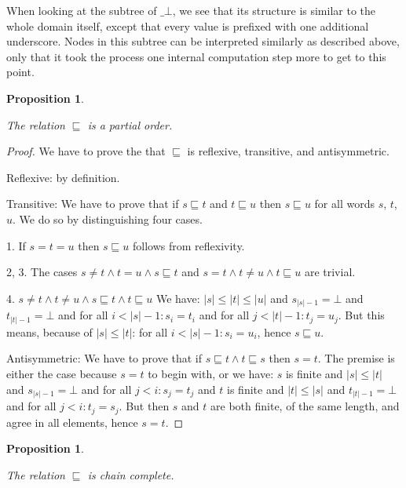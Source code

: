 \documentclass[a4paper]{article}
\newtheorem{thmPONuFisPartialOrder}[defNuF]{Proposition}
\newtheorem{thmPONuFisChainComplete}[defNuF]{Proposition}
\begin{document}
When looking at the subtree of $\_\bot$, we see that its structure is similar
to the whole domain itself, except that every value is prefixed with one additional
underscore.  Nodes in this subtree can be interpreted similarly as described
above, only that it took the process one internal computation step more to
get to this point.

\begin{thmPONuFisPartialOrder}
\label{thmPONuFisPartialOrder}

The relation $\sqsubseteq$ is a partial order.

\end{thmPONuFisPartialOrder}


\begin{proof}

We have to prove the that $\sqsubseteq$ is reflexive, transitive, and
antisymmetric.

Reflexive: by definition.

Transitive: We have to prove that if $s \sqsubseteq t$ and $t \sqsubseteq u$
then $s \sqsubseteq u$ for all words $s$, $t$, $u$. We do so by distinguishing
four cases.

1. If $s = t = u$ then $s \sqsubseteq u$ follows from reflexivity.

2, 3. The cases $s \neq t \wedge t = u \wedge s \sqsubseteq t$ and $s = t
\wedge t \neq u \wedge t \sqsubseteq u$ are trivial.

4. $s \neq t \wedge t \neq u \wedge s \sqsubseteq t \wedge t \sqsubseteq u$ We
have: $|s| \leq |t| \leq |u|$ and $s_{|s|-1} = \bot$ and $t_{|t|-1} = \bot$ and
for all $i < |s|-1: s_i = t_i$ and for all $j < |t|-1: t_j = u_j$.  But this
means, because of $|s| \leq |t|$: for all $i < |s|-1: s_i = u_i$, hence $s
\sqsubseteq u$.

Antisymmetric: We have to prove that if $s \sqsubseteq t \wedge t \sqsubseteq
s$ then $s = t$.  The premise is either the case because $s = t$ to begin with,
or we have: $s$ is finite and $|s| \leq |t|$ and $s_{|s|-1} = \bot$ and for all $j <
i: s_j = t_j$ and $t$ is finite and $|t| \leq |s|$ and $t_{|t|-1} = \bot$ and for all
$j < i: t_j = s_j$.  But then $s$ and $t$ are both finite, of the same length,
and agree in all elements, hence $s = t$.

\end{proof}

\begin{thmPONuFisChainComplete}
\label{thmPONuFisChainComplete}

The relation $\sqsubseteq$ is chain complete.

\end{thmPONuFisChainComplete}
\end{document}
